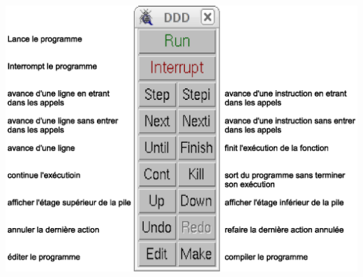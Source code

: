 \documentclass[12pt,a4paper]{article}
\begin{document}






\begin{center}
  \noindent\includegraphics[width=\linewidth]{commandes.eps}
\end{center}
\end{document}
